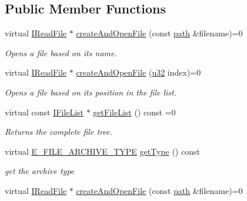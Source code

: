\subsection*{Public Member Functions}
\begin{DoxyCompactItemize}
\item 
virtual \hyperlink{classirr_1_1io_1_1IReadFile}{I\+Read\+File} $\ast$ \hyperlink{classirr_1_1io_1_1IFileArchive_a5c3b4994ae63447d2634dd86b3069988}{create\+And\+Open\+File} (const \hyperlink{namespaceirr_1_1io_a6468281622ce3a1c46b72e19f32dded5}{path} \&filename)=0
\begin{DoxyCompactList}\small\item\em Opens a file based on its name. \end{DoxyCompactList}\item 
virtual \hyperlink{classirr_1_1io_1_1IReadFile}{I\+Read\+File} $\ast$ \hyperlink{classirr_1_1io_1_1IFileArchive_ab6bc8fbd660bbbe42b4d30a9d4f26c7d}{create\+And\+Open\+File} (\hyperlink{namespaceirr_a0416a53257075833e7002efd0a18e804}{u32} index)=0
\begin{DoxyCompactList}\small\item\em Opens a file based on its position in the file list. \end{DoxyCompactList}\item 
virtual const \hyperlink{classirr_1_1io_1_1IFileList}{I\+File\+List} $\ast$ \hyperlink{classirr_1_1io_1_1IFileArchive_a73c683318837b13d16843373da00ded3}{get\+File\+List} () const =0
\begin{DoxyCompactList}\small\item\em Returns the complete file tree. \end{DoxyCompactList}\item 
\mbox{\label{classirr_1_1io_1_1IFileArchive_ae991b223b7f3b8b47916d82d842e3004}} 
virtual \hyperlink{namespaceirr_1_1io_adb3e3c445ec8e608ed1f0f93306da14f}{E\+\_\+\+F\+I\+L\+E\+\_\+\+A\+R\+C\+H\+I\+V\+E\+\_\+\+T\+Y\+PE} \hyperlink{classirr_1_1io_1_1IFileArchive_ae991b223b7f3b8b47916d82d842e3004}{get\+Type} () const
\begin{DoxyCompactList}\small\item\em get the archive type \end{DoxyCompactList}\item 
virtual \hyperlink{classirr_1_1io_1_1IReadFile}{I\+Read\+File} $\ast$ \hyperlink{classirr_1_1io_1_1IFileArchive_a5c3b4994ae63447d2634dd86b3069988}{create\+And\+Open\+File} (const \hyperlink{namespaceirr_1_1io_a6468281622ce3a1c46b72e19f32dded5}{path} \&filename)=0

\end{DoxyCompactItemize}
